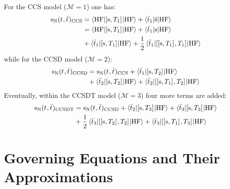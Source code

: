 For the \gls{CCS} model ($\mathcal{M} = 1$) one has:
\begin{equation}\label{eq:source-ccs}
  \begin{aligned}
    \mathrm{s}_{\mathrm{N}}(t_{}, \bar{t}_{})_\mathrm{CCS} &=
  \braket{\mathrm{HF} | [ \mathrm{s}, T_1 ]^{} | \mathrm{HF}}
  + \braket{\bar{t}_{1} | \check{\mathrm{s}} | \mathrm{HF}} \\
  &=
  \braket{\mathrm{HF} | [ \mathrm{s}, T_1 ]^{} | \mathrm{HF}}
  + \braket{\bar{t}_{1} | \mathrm{s} | \mathrm{HF}} \\
  &+ \braket{\bar{t}_{1} | [ \mathrm{s}, T_1 ]^{} | \mathrm{HF}}
  + \frac{1}{2}\braket{\bar{t}_{1} | [ [ \mathrm{s}, T_1 ]^{}, T_1 ]^{} | \mathrm{HF}}
  \end{aligned}
\end{equation}
while for the \gls{CCSD} model ($\mathcal{M} = 2$):
\begin{equation}\label{eq:source-ccsd}
  \begin{aligned}
  \mathrm{s}_{\mathrm{N}}(t_{}, \bar{t}_{})_\mathrm{CCSD} &=
  \mathrm{s}_{\mathrm{N}}(t_{}, \bar{t}_{})_\mathrm{CCS}
  + \braket{\bar{t}_{1} | [ \mathrm{s}, T_2 ]^{} | \mathrm{HF}} \\
  &+ \braket{\bar{t}_{2} | [ \mathrm{s}, T_2 ]^{} | \mathrm{HF}}
  + \braket{\bar{t}_{2} | [ [ \mathrm{s}, T_1 ]^{}, T_2 ]^{} | \mathrm{HF}}
  \end{aligned}
\end{equation}
Eventually, within the \gls{CCSDT} model ($\mathcal{M} = 3$) four more
terms are added:
\begin{equation}\label{eq:source-ccsdt}
  \begin{aligned}
    \mathrm{s}_{\mathrm{N}}(t_{}, \bar{t}_{})_\mathrm{CCSDT} &=
  \mathrm{s}_{\mathrm{N}}(t_{}, \bar{t}_{})_\mathrm{CCSD}
  + \braket{\bar{t}_{2} | [ \mathrm{s}, T_3 ]^{} | \mathrm{HF}}
  + \braket{\bar{t}_{3} | [ \mathrm{s}, T_3 ]^{} | \mathrm{HF}} \\
  &+ \frac{1}{2}
  \braket{\bar{t}_{3} | [ [ \mathrm{s}, T_2 ]^{}, T_2 ]^{} |
  \mathrm{HF}}
  + \braket{\bar{t}_{3} | [ [ \mathrm{s}, T_1 ]^{}, T_3 ]^{} |
  \mathrm{HF}}
  \end{aligned}
\end{equation}

\section{Governing Equations and Their Approximations}\label{sec:pcm-cc-models}

